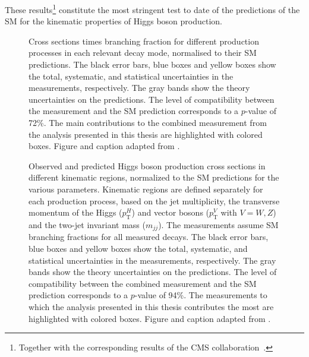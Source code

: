 These results\footnote{Together with the corresponding results of the CMS collaboration~\cite{CMSNaturePaper}.} constitute the most stringent test to date of the predictions of the SM for the kinematic properties of Higgs boson production.
\begin{figure}[b]
    \caption{Cross sections times branching fraction for different production processes in each relevant decay mode, normalised to their SM predictions. The black error bars, blue boxes and yellow boxes show the total, systematic, and statistical uncertainties in the measurements, respectively. The gray bands show the theory uncertainties on the predictions. The level of compatibility between the measurement and the SM prediction corresponds to a $p$-value of 72\%. 
    The main contributions to the combined measurement from the \HWW analysis presented in this thesis are highlighted with colored boxes. 
    Figure and caption adapted from .}
    \label{fig:prod-per-channel}
\end{figure}

\begin{figure}
    \caption{
      Observed and predicted Higgs boson production cross sections in different
    kinematic regions, normalized to the SM predictions for the various parameters. 
    Kinematic regions are defined separately for each production process, based on the jet multiplicity, the transverse momentum of the Higgs ($p_{\textrm{T}}^H$) and vector bosons ($p_{\textrm{T}}^V$ with $V = W, Z$) and the two-jet invariant mass ($m_{jj}$).
    The measurements assume SM branching fractions for all measured decays. The black error bars, blue boxes and yellow boxes show the total, systematic, and statistical uncertainties in the measurements, respectively. The gray bands show the theory uncertainties on the predictions. The level of compatibility between the combined measurement and the SM prediction corresponds to a $p$-value of 94\%. 
    The measurements to which the \HWW analysis presented in this thesis contributes the most are highlighted with colored boxes. 
    Figure and caption adapted from .
    }
    \label{fig:stxs-stage12}
  \end{figure}

